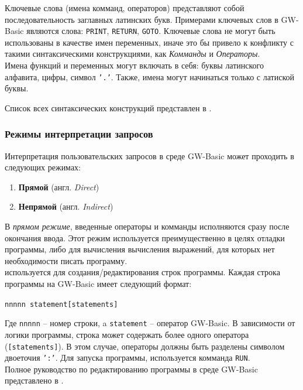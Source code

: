 \documentclass[12pt]{article}
\begin{document}
			\indent Ключевые слова (имена комманд, операторов) представляют собой последовательность заглавных латинских букв. Примерами ключевых слов в GW-Basic являются слова: {\tt PRINT}, {\tt RETURN}, {\tt GOTO}. Ключевые слова не могут быть использованы в качестве имен переменных, иначе это бы привело к конфликту с такими синтаксическими конструкциями, как {\it Комманды} и {\it Операторы}. \\
			\indent Имена функций и переменных могут включать в себя: буквы латинского алфавита, цифры, символ {\tt '.'}. Также, имена могут начинаться только с латиской буквы.
			
			\indent Список всех синтаксических конструкций представлен в \cite[стр.~117]{basicManual}.
			\subsubsection{Режимы интерпретации запросов}
			\label{subsec:interpTypes}
			\hspace{\parindent} Интерпретация пользовательских запросов в среде GW-Basic может проходить в следующих режимах:
			\begin{enumerate}
				\item {\bf Прямой} (англ. {\it Direct}) 
				\item {\bf Непрямой} (англ. {\it Indirect}) 
			\end{enumerate}
			
			\indent В {\it прямом режиме}, введенные операторы и комманды исполняются сразу после окончания ввода. Этот режим используется преимущественно в целях отладки программы, либо для вычисления вычисления выражений, для которых нет необходимости писать программу. \\
			 используется для создания/редактирования строк программы. Каждая строка программы на GW-Basic имеет следующий формат:
			\begin{center}
				\tt nnnnn statement[statements]
			\end{center}

			\indent	Где {\tt nnnnn} -- номер строки, a {\tt statement} -- оператор GW-Basic. В зависимости от логики программы, строка может содержать более одного оператора ({\tt [statements]}). В этом случае, операторы должны быть разделены символом двоеточия {\tt ':'}. Для запуска программы, используется комманда {\tt RUN}.\\
			\indent Полное руководство по редактированию программы в среде GW-Basic представлено в \cite[стр.~18]{basicManual}.
\end{document}
